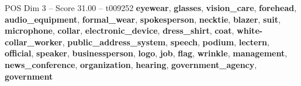 \begin{textsample}{POS Dim 3 – Score 31.00 – t009252}  \label{ex:f3_pos_018}
\textbf{eyewear}, \textbf{glasses}, \textbf{vision\_care}, \textbf{forehead}, \textbf{audio\_equipment}, \textbf{formal\_wear}, \textbf{spokesperson}, \textbf{necktie}, \textbf{blazer}, \textbf{suit}, \textbf{microphone}, \textbf{collar}, \textbf{electronic\_device}, \textbf{dress\_shirt}, \textbf{coat}, \textbf{white-collar\_worker}, \textbf{public\_address\_system}, \textbf{speech}, \textbf{podium}, \textbf{lectern}, \textbf{official}, \textbf{speaker}, \textbf{businessperson}, \textbf{logo}, \textbf{job}, \textbf{flag}, \textbf{wrinkle}, \textbf{management}, \textbf{news\_conference}, \textbf{organization}, \textbf{hearing}, \textbf{government\_agency}, \textbf{government}

\end{textsample}
